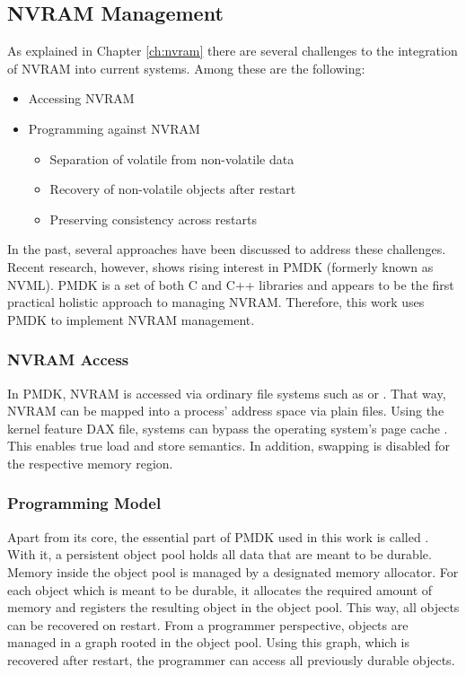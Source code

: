 \subsection{NVRAM Management}
\label{ch:impl-nvram}

As explained in Chapter \ref{ch:nvram} there are several challenges to the
integration of NVRAM into current systems. Among these are the following:

\begin{itemize}
    \item Accessing NVRAM
    \item Programming against NVRAM
    \begin{itemize}
        \item Separation of volatile from non-volatile data
        \item Recovery of non-volatile objects after restart
        \item Preserving consistency across restarts
    \end{itemize}
\end{itemize}

In the past, several approaches have been discussed to address these challenges.
Recent research, however, shows rising interest in PMDK (formerly known as
NVML). PMDK is a set of both C and C++ libraries and appears to be the first
practical holistic approach to managing NVRAM. Therefore, this work uses PMDK to
implement NVRAM management.

\subsubsection{NVRAM Access}

In PMDK, NVRAM is accessed via ordinary file systems such as  or
. That way, NVRAM can be mapped into a process' address space via
plain files. Using the kernel feature \ac{DAX} file,
systems can bypass the operating system's page cache \cite{oukid2017data,
andrei2017sap, rudoff2017persistent}. This enables true load and store
semantics. In addition, swapping is disabled for the respective memory region.

\subsubsection{Programming Model}

Apart from its core, the essential part of PMDK used in this work is called
. With it, a persistent object pool holds all data that are meant
to be durable. Memory inside the object pool is managed by a designated memory
allocator. For each object which is meant to be durable, it allocates the
required amount of memory and registers the resulting object in the object pool.
This way, all objects can be recovered on restart. From a programmer
perspective, objects are managed in a graph rooted in the object pool. Using
this graph, which is recovered after restart, the programmer can access all
previously durable objects.

